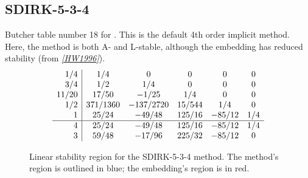 \documentclass[letterpaper,10pt,english]{sphinxmanual}
\begin{document}
\subsection{SDIRK-5-3-4}
\label{Butcher:butcher-sdirk-5-4}\label{Butcher:sdirk-5-3-4}
Butcher table number 18
for {\hyperref[c_interface/User_callable:c.ARKodeSetIRKTableNum]{\emph{}}}.  This is
the default 4th order implicit method.  Here, the method is both A-
and L-stable, although the embedding has reduced stability (from \label{Butcher:id17}{\hyperref[References:hw1996]{\emph{{[}HW1996{]}}}}).
\begin{gather}
\begin{split}\begin{array}{r|ccccc}
  1/4 & 1/4 & 0 & 0 & 0 & 0 \\
  3/4 & 1/2 & 1/4 & 0 & 0 & 0 \\
  11/20 & 17/50 & -1/25 & 1/4 & 0 & 0 \\
  1/2 & 371/1360 & -137/2720 & 15/544 & 1/4 & 0 \\
  1 & 25/24 & -49/48 & 125/16 & -85/12 & 1/4 \\
  \hline
  4 & 25/24 & -49/48 & 125/16 & -85/12 & 1/4 \\
  3 & 59/48 & -17/96 & 225/32 & -85/12 & 0
\end{array}\end{split}\notag
\end{gather}\begin{figure}[htbp]
\centering
\capstart

\caption{Linear stability region for the SDIRK-5-3-4 method.  The method's
region is outlined in blue; the embedding's region is in red.}\end{figure}
\end{document}
